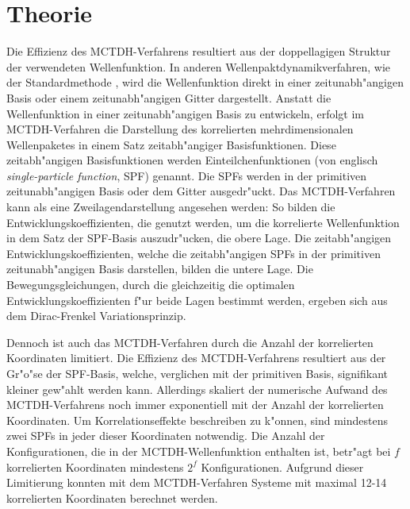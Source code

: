 \chapter{Theorie}
\label{ch:theo}


 Die Effizienz des MCTDH-Verfahrens resultiert aus der doppellagigen Struktur der verwendeten Wellenfunktion. In anderen Wellenpaktdynamikverfahren, 
wie der Standardmethode \cite{MCTDHreview3}, wird die Wellenfunktion direkt in einer zeitunabh"angigen Basis oder einem zeitunabh"angigen Gitter dargestellt. 
Anstatt die Wellenfunktion in einer zeitunabh"angigen Basis zu entwickeln,
erfolgt im MCTDH-Verfahren die Darstellung des korrelierten mehrdimensionalen Wellenpaketes in einem Satz zeitabh"angiger Basisfunktionen.
Diese zeitabh"angigen Basisfunktionen werden Einteilchenfunktionen (von englisch \textit{single-parti\-cle function}, SPF) genannt. 
Die SPFs werden in der primitiven zeitunabh"angigen Basis oder dem Gitter ausgedr"uckt.
Das MCTDH-Verfahren kann als eine Zweilagendarstellung angesehen werden:
So bilden die Entwicklungskoeffizienten, die genutzt werden, um die korrelierte Wellenfunktion in dem Satz der SPF-Basis auszudr"ucken, die obere Lage.
Die zeitabh"angigen Entwicklungskoeffizienten, welche die zeitabh"angigen SPFs in der primitiven zeitunabh"angigen Basis darstellen, bilden die untere Lage.
Die Bewegungsgleichungen, durch die gleichzeitig die optimalen Entwicklungskoeffizienten f"ur beide Lagen bestimmt werden, ergeben sich aus dem Dirac-Frenkel Variationsprinzip.
   
Dennoch ist auch das MCTDH-Verfahren durch die Anzahl der korrelierten Koordinaten limitiert. 
Die Effizienz des MCTDH-Verfahrens resultiert aus der Gr"o"se der SPF-Basis, welche, verglichen mit der primitiven Basis, signifikant kleiner gew"ahlt werden kann.
Aller\-dings skaliert der numerische Aufwand des MCTDH-Verfahrens noch immer exponentiell mit der Anzahl der kor\-relierten Koordinaten.
Um Korrelationseffekte beschreiben zu k"onnen, sind mindestens zwei SPFs in jeder dieser Koordinaten notwendig.
Die Anzahl der Konfigurationen, die in der MCTDH-Wellenfunktion enthalten ist, betr"agt bei $ f $ kor\-relierten Koordinaten mindestens $ 2^f $ Konfigurationen.
Aufgrund dieser Limitierung konnten mit dem MCTDH-Verfahren Systeme mit maximal 12-14 kor\-relierten Koordinaten  berechnet werden.\cite{HM1, HM2, HM4, WWM, WWM2, HM5,
 WMC, BWHHM}
 

